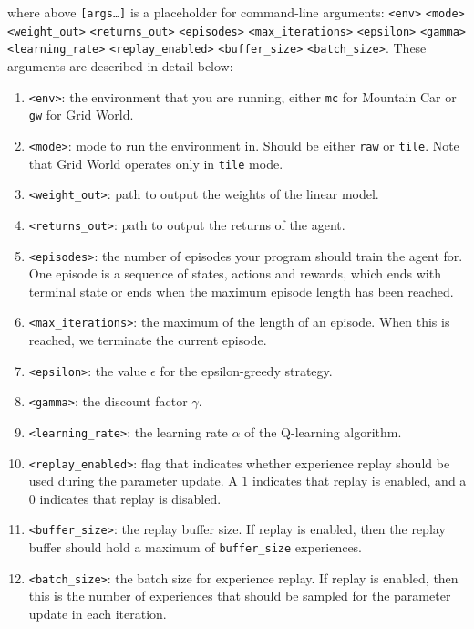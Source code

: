 \documentclass[11pt,addpoints,answers]{exam}
\begin{document}
where above \texttt{[args\dots]} is a placeholder for command-line arguments: \texttt{<env>} \texttt{<mode>} \texttt{<weight\_out>} \texttt{<returns\_out>} \texttt{<episodes>} \texttt{<max\_iterations>} \texttt{<epsilon>} \texttt{<gamma>} \texttt{<learning\_rate>} \texttt{<replay\_enabled>} \texttt{<buffer\_size>} \texttt{<batch\_size>}. These arguments are described in detail below:
\begin{enumerate}
    \item \texttt{<env>}: the environment that you are running, either \texttt{mc} for Mountain Car or \texttt{gw} for Grid World.
    \item \texttt{<mode>}: mode to run the environment in. Should be either \texttt{raw} or \texttt{tile}. Note that Grid World operates only in \texttt{tile} mode.
    \item \texttt{<weight\_out>}: path to output the weights of the linear model.
    \item \texttt{<returns\_out>}: path to output the returns of the agent.
    \item \texttt{<episodes>}: the number of episodes your program should train the agent for. One episode is a sequence of states, actions and rewards, which ends with terminal state or ends when the maximum episode length has been reached.
    \item \texttt{<max\_iterations>}: the maximum of the length of an episode. When this is reached, we terminate the current episode.
    \item \texttt{<epsilon>}: the value $\epsilon$ for the epsilon-greedy strategy.
    \item \texttt{<gamma>}: the discount factor $\gamma$.
    \item \texttt{<learning\_rate>}: the learning rate $\alpha$ of the Q-learning algorithm.
    \item \texttt{<replay\_enabled>}: flag that indicates whether experience replay should be used during the parameter update. A $1$ indicates that replay is enabled, and a $0$ indicates that replay is disabled.
    \item \texttt{<buffer\_size>}: the replay buffer size. If replay is enabled, then the replay buffer should hold a maximum of \texttt{buffer\_size} experiences.
    \item \texttt{<batch\_size>}: the batch size for experience replay. If replay is enabled, then this is the number of experiences that should be sampled for the parameter update in each iteration.
\end{enumerate}
\end{document}
